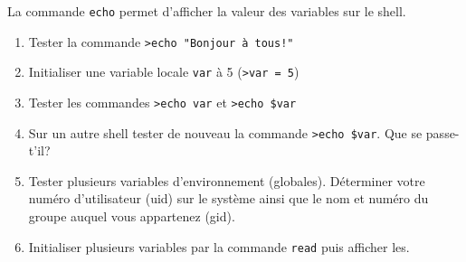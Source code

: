 \documentclass[a4paper,11pt]{exam}
\begin{document}
{
	    La commande \texttt{echo} permet d'afficher la valeur des variables sur le shell.
	    \begin{enumerate}
	    \item Tester la commande \texttt{>echo "Bonjour à tous!"} 
	    \item Initialiser une variable locale \texttt{var} à 5 (\texttt{>var = 5})
	    \item Tester les commandes \texttt{>echo var} et \texttt{>echo \$var}
	    \item Sur un autre shell tester de nouveau la commande \texttt{>echo \$var}. Que se passe-t'il?
	    \item Tester plusieurs variables d'environnement (globales). Déterminer votre numéro d’utilisateur (uid) sur le système ainsi que le nom et numéro du groupe auquel vous appartenez (gid).
	    \item Initialiser plusieurs variables par la commande \texttt{read} puis afficher les.
	    \end{enumerate}
 } 
\end{document}
